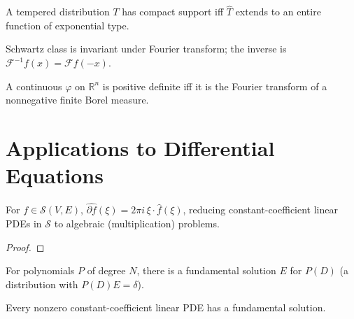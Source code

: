 \begin{theorem}
  \label{thm:paley-wiener}
  \leanok
  A tempered distribution $T$ has compact support iff $\widehat{T}$
  extends to an entire function of exponential type.
\end{theorem}

\begin{theorem}
  \label{thm:fourier-schwartz-invariant}
  \leanok
  Schwartz class is invariant under Fourier transform; the inverse
  is $\mathcal F^{-1} f(x) = \mathcal F f(-x)$.
\end{theorem}

\begin{theorem}
  \label{thm:bochner}
  \leanok
  A continuous $\varphi$ on $\mathbb R^n$ is positive definite iff
  it is the Fourier transform of a nonnegative finite Borel measure.
\end{theorem}

\chapter{Applications to Differential Equations}

\begin{theorem}
  \label{thm:fourier-derivative}
  \leanok
  For $f \in \mathcal{S}(V,E)$,
  $\widehat{\partial f}(\xi) = 2\pi i\,\xi \cdot \widehat{f}(\xi)$,
  reducing constant-coefficient linear PDEs in $\mathcal{S}$ to
  algebraic (multiplication) problems.
\end{theorem}
\begin{proof}
  \leanok
\end{proof}


\begin{theorem}
  \label{thm:fundamental-solution}
  \leanok
  For polynomials $P$ of degree $N$, there is a fundamental solution
  $E$ for $P(D)$ (a distribution with $P(D) E = \delta$).
\end{theorem}

\begin{theorem}
  \label{thm:malgrange-ehrenpreis}
  \leanok
  Every nonzero constant-coefficient linear PDE has a fundamental
  solution.
\end{theorem}

